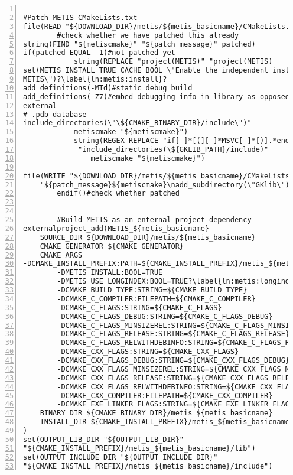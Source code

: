 \documentclass[10pt,a4paper]{article}
\begin{document}
\begin{codeparchment}
\begin{lstlisting}[numbers=left]

#Patch METIS CMakeLists.txt 
file(READ "${DOWNLOAD_DIR}/metis/${metis_basicname}/CMakeLists.txt" metiscmake)
		#check whether we have patched this already
string(FIND "${metiscmake}" "${patch_message}" patched)
if(patched EQUAL -1)#not patched yet
			string(REPLACE "project(METIS)" "project(METIS)
set(METIS_INSTALL TRUE CACHE BOOL \"Enable the independent install of
METIS\")?\label{ln:metis:install}?
add_definitions(-MTd)#static debug build
add_definitions(-Z7)#embed debugging info in library as opposed to using an
external 
# .pdb database
include_directories(\"\${CMAKE_BINARY_DIR}/include\")"
			metiscmake "${metiscmake}")
			string(REGEX REPLACE "if[ ]*[(][ ]*MSVC[ ]*[)].*endif[ ]*[(][^)]*[)]"
			 "include_directories(\${GKLIB_PATH}/include)" 
				metiscmake "${metiscmake}")

file(WRITE "${DOWNLOAD_DIR}/metis/${metis_basicname}/CMakeLists.txt" 
	"${patch_message}${metiscmake}\nadd_subdirectory(\"GKlib\")")
		endif()#check whether patched


		#Build METIS as an enternal project dependency
externalproject_add(METIS_${metis_basicname}
	SOURCE_DIR ${DOWNLOAD_DIR}/metis/${metis_basicname}
	CMAKE_GENERATOR ${CMAKE_GENERATOR}
	CMAKE_ARGS
-DCMAKE_INSTALL_PREFIX:PATH=${CMAKE_INSTALL_PREFIX}/metis_${metis_basicname} 
		-DMETIS_INSTALL:BOOL=TRUE 
		-DMETIS_USE_LONGINDEX:BOOL=TRUE?\label{ln:metis:longindex}?
		-DCMAKE_BUILD_TYPE:STRING=${CMAKE_BUILD_TYPE}
  		-DCMAKE_C_COMPILER:FILEPATH=${CMAKE_C_COMPILER}
    	-DCMAKE_C_FLAGS:STRING=${CMAKE_C_FLAGS}
    	-DCMAKE_C_FLAGS_DEBUG:STRING=${CMAKE_C_FLAGS_DEBUG}
    	-DCMAKE_C_FLAGS_MINSIZEREL:STRING=${CMAKE_C_FLAGS_MINSIZEREL}
    	-DCMAKE_C_FLAGS_RELEASE:STRING=${CMAKE_C_FLAGS_RELEASE}
    	-DCMAKE_C_FLAGS_RELWITHDEBINFO:STRING=${CMAKE_C_FLAGS_RELWITHDEBINFO}
    	-DCMAKE_CXX_FLAGS:STRING=${CMAKE_CXX_FLAGS}
    	-DCMAKE_CXX_FLAGS_DEBUG:STRING=${CMAKE_CXX_FLAGS_DEBUG}
    	-DCMAKE_CXX_FLAGS_MINSIZEREL:STRING=${CMAKE_CXX_FLAGS_MINSIZEREL}
    	-DCMAKE_CXX_FLAGS_RELEASE:STRING=${CMAKE_CXX_FLAGS_RELEASE}
    	-DCMAKE_CXX_FLAGS_RELWITHDEBINFO:STRING=${CMAKE_CXX_FLAGS_RELWITHDEBINFO}
    	-DCMAKE_CXX_COMPILER:FILEPATH=${CMAKE_CXX_COMPILER}
    	-DCMAKE_EXE_LINKER_FLAGS:STRING=${CMAKE_EXE_LINKER_FLAGS} 
	BINARY_DIR ${CMAKE_BINARY_DIR}/metis_${metis_basicname}
	INSTALL_DIR ${CMAKE_INSTALL_PREFIX}/metis_${metis_basicname}
)
set(OUTPUT_LIB_DIR "${OUTPUT_LIB_DIR}"
"${CMAKE_INSTALL_PREFIX}/metis_${metis_basicname}/lib")
set(OUTPUT_INCLUDE_DIR "${OUTPUT_INCLUDE_DIR}" 
"${CMAKE_INSTALL_PREFIX}/metis_${metis_basicname}/include")
\end{lstlisting}
\end{codeparchment}
\end{document}
